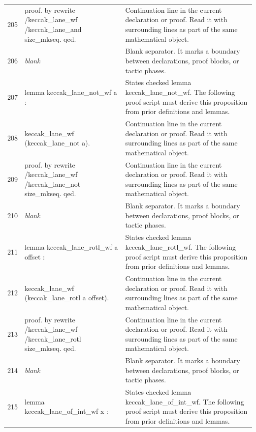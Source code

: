 \documentclass[10pt]{article}
\begin{document}
\begin{longtable}{r L{0.53\textwidth} L{0.37\textwidth}}
205 & {\ttfamily\scriptsize proof. by rewrite /keccak\_lane\_wf /keccak\_lane\_and size\_mkseq. qed.} & Continuation line in the current declaration or proof.  Read it with surrounding lines as part of the same mathematical object. \\
206 & {\ttfamily\scriptsize \emph{blank}} & Blank separator.  It marks a boundary between declarations, proof blocks, or tactic phases. \\
207 & {\ttfamily\scriptsize lemma keccak\_lane\_not\_wf a :} & States checked lemma keccak\_lane\_not\_wf.  The following proof script must derive this proposition from prior definitions and lemmas. \\
208 & {\ttfamily\scriptsize   keccak\_lane\_wf (keccak\_lane\_not a).} & Continuation line in the current declaration or proof.  Read it with surrounding lines as part of the same mathematical object. \\
209 & {\ttfamily\scriptsize proof. by rewrite /keccak\_lane\_wf /keccak\_lane\_not size\_mkseq. qed.} & Continuation line in the current declaration or proof.  Read it with surrounding lines as part of the same mathematical object. \\
210 & {\ttfamily\scriptsize \emph{blank}} & Blank separator.  It marks a boundary between declarations, proof blocks, or tactic phases. \\
211 & {\ttfamily\scriptsize lemma keccak\_lane\_rotl\_wf a offset :} & States checked lemma keccak\_lane\_rotl\_wf.  The following proof script must derive this proposition from prior definitions and lemmas. \\
212 & {\ttfamily\scriptsize   keccak\_lane\_wf (keccak\_lane\_rotl a offset).} & Continuation line in the current declaration or proof.  Read it with surrounding lines as part of the same mathematical object. \\
213 & {\ttfamily\scriptsize proof. by rewrite /keccak\_lane\_wf /keccak\_lane\_rotl size\_mkseq. qed.} & Continuation line in the current declaration or proof.  Read it with surrounding lines as part of the same mathematical object. \\
214 & {\ttfamily\scriptsize \emph{blank}} & Blank separator.  It marks a boundary between declarations, proof blocks, or tactic phases. \\
215 & {\ttfamily\scriptsize lemma keccak\_lane\_of\_int\_wf x :} & States checked lemma keccak\_lane\_of\_int\_wf.  The following proof script must derive this proposition from prior definitions and lemmas. \\

\end{longtable}
\end{document}
